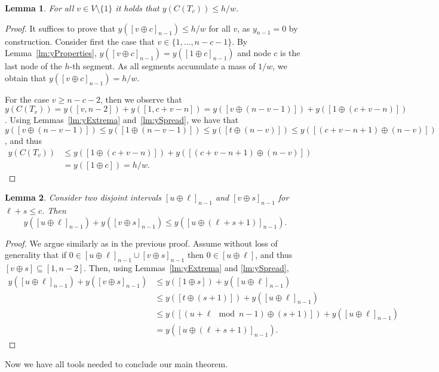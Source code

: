 \documentclass[11pt]{article}
\newtheorem{lemma}{Lemma}[section]
\newcommand\+{\mkern2mu}
\begin{document}
\begin{lemma}\label{lm:yCtmax}
For all $v\in V\setminus\{1\}$ it holds that $y(C(T_v))\le h/w$.
\end{lemma}
\begin{proof}
    It suffices to prove that $y([v\oplus c]_{n-1})\le h/w$ for all $v$, as $y_{n-1}=0$ by construction. Consider first the case that $v \in \{1, \ldots, n-c-1\}$. By Lemma~\ref{lm:yProperties}, $y([v\oplus c]_{n-1})=y([1\oplus c]_{n-1})$ and node $c$ is the last node of the $h$-th segment. As all segments accumulate a mass of $1/w$, we obtain that $y([v\oplus c]_{n-1})=h/w$.  

    For the case $v\ge n-c-2$, then we observe that $y(C(T_v))= y([v,n-2]) + y([1,c+v-n])= y([v\oplus (n-v-1)]) + y([1\oplus (c+v-n)])$. Using Lemmas~\ref{lm:yExtrema} and~\ref{lm:ySpread}, we have that $y([v\oplus (n-v-1)])\le y([1\oplus (n-v-1)])\le y([t\oplus (n-v)])\le y([(c+v-n+1)\oplus(n-v)])$, and thus
    \begin{align*}
    y(C(T_v))& \le y([1\oplus (c+v-n)]) + y([(c+v-n+1)\oplus(n-v)]) \\
     & = y([1\oplus c])=h/w.
    \end{align*}    
\end{proof}

\begin{lemma}\label{lm:ymergeCoprime}
Consider two disjoint intervals $[u\oplus\ell]_{n-1}$ and $[v\oplus s]_{n-1}$ for $\ell+s\le c$. Then 
$$y([u\oplus \ell]_{n-1})+y([v\oplus s]_{n-1})\le y([u\oplus (\ell+s+1)]_{n-1}).$$
\end{lemma}
\begin{proof} We argue similarly as in the previous proof. Assume without loss of generality that if $0 \in [u\oplus \ell]_{n-1} \cup [v\oplus s]_{n-1}$ then $0 \in [u\oplus \ell] $, and thus $[v \oplus s]\subseteq [1,n-2].$ Then, using Lemmas~\ref{lm:yExtrema} and \ref{lm:ySpread},
\begin{align*}
y([u\oplus \ell]_{n-1})+y([v\oplus s]_{n-1}) & \le y([1\oplus s])+y([u\oplus \ell]_{n-1}) \\
 & \le y([t\oplus (s+1)])+y([u\oplus \ell]_{n-1}) \\
 & \le y([(u+\ell\mod n-1 )\oplus (s+1)])+y([u\oplus \ell]_{n-1}) \\
 &= y([u\oplus (\ell+s+1)]_{n-1}).
\end{align*}
\end{proof}

Now we have all tools needed to conclude our main theorem.
\end{document}
